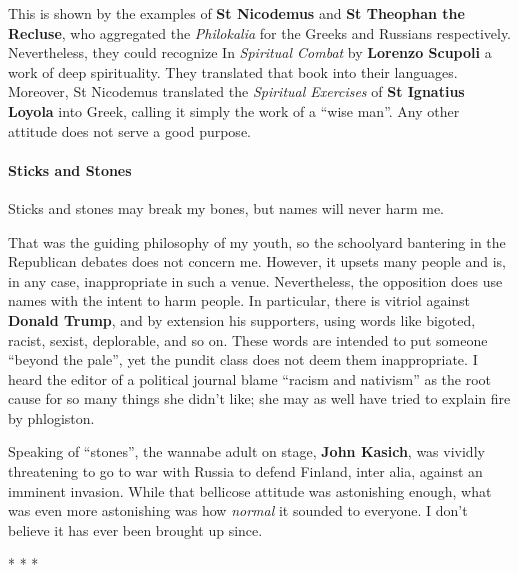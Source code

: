 This is shown by the examples of \textbf{St Nicodemus} and \textbf{St Theophan the Recluse}, who aggregated the \emph{Philokalia} for the Greeks and Russians respectively. Nevertheless, they could recognize In \emph{Spiritual Combat} by \textbf{Lorenzo Scupoli} a work of deep spirituality. They translated that book into their languages. Moreover, St Nicodemus translated the \emph{Spiritual Exercises} of \textbf{St Ignatius Loyola} into Greek, calling it simply the work of a ``wise man''. Any other attitude does not serve a good purpose.

\paragraph{Sticks and Stones}


\begin{quotex}
Sticks and stones may break my bones, but names will never harm me.
\end{quotex}


That was the guiding philosophy of my youth, so the schoolyard bantering in the Republican debates does not concern me. However, it upsets many people and is, in any case, inappropriate in such a venue. Nevertheless, the opposition does use names with the intent to harm people. In particular, there is vitriol against \textbf{Donald Trump}, and by extension his supporters, using words like bigoted, racist, sexist, deplorable, and so on. These words are intended to put someone ``beyond the pale'', yet the pundit class does not deem them inappropriate. I heard the editor of a political journal blame ``racism and nativism'' as the root cause for so many things she didn't like; she may as well have tried to explain fire by phlogiston.

Speaking of ``stones'', the wannabe adult on stage, \textbf{John Kasich}, was vividly threatening to go to war with Russia to defend Finland, inter alia, against an imminent invasion. While that bellicose attitude was astonishing enough, what was even more astonishing was how
\emph{normal} it sounded to everyone. I don't believe it has ever been brought up since.



\begin{center}* * *\end{center}

